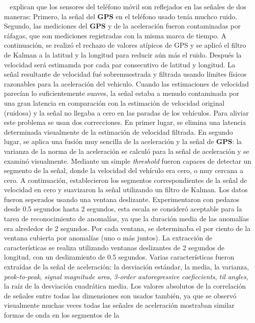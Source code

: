 ~\parencite{perttunen2011distributed} explican que los sensores del teléfono móvil son reflejados en las señales de dos maneras: Primero, la señal del \textbf{GPS}
en el teléfono usado tenía muchco ruido. Segundo, las mediciones del \textbf{GPS} y de la aceleración fueron contaminadas por ráfagas, que son mediciones registradas con la
misma marca de tiempo. A continuación, se realizó el rechazo de valores atípicos de GPS y se aplicó el filtro de Kalman a la latitud y la longitud para reducir
aún más el ruido. Después la velocidad será estimamda por cada par consecutivo de latitud y longitud. La señal resultante de velocidad fué sobremuestrada y filtrada
usando límites físicos razonables para la aceleración del vehiculo. Cuando las estimaciones de velocidad parecían lo suficientemente suaves, la señal estaba
a menudo contaminada por una gran latencia en comparación con la estimación de velocidad original (ruidosa) y la señal no llegaba a cero en las paradas de los vehículos.
Para aliviar este problema se usan dos correcciones. En primer lugar, se elimina una latencia determinada visualmente de la estimación de velocidad filtrada. En segundo
lugar, se aplica una fusión muy sencilla de la aceleración y la señal de \textbf{GPS}: la varianza de la norma de la aceleración se calculó para la señal de aceleración
y se examinó visualmente. Mediante un simple \emph{threshold} fueron capaces de detectar un segmento de la señal, donde la velocidad del vehículo era cero, o muy cercana
a cero. A continuación, establecieron los segmentos correspondientes de la señal de velocidad en cero y suavizaron la señal utilizando un filtro de Kalman. Los datos
fueron seperados usando una ventana deslizante. Experimentaron con pedazos desde 0.5 segundos hasta 2 segundos, esta escala se consideró aceptable para la tarea de
reconocimiento de anomalías, ya que la duración media de las anomalías era alrededor de 2 segundos. Por cada ventana, se determinaba el por ciento de la ventana cubierta
por anomalías (uno o más juntos). La extracción de características se realiza utilizando ventanas deslizantes de 2 segundos de longitud, con un deslizamiento de 0.5
segundos. Varias características fueron extraídas de la señal de aceleración: la desviación estándar, la media, la varianza, \emph{peok-to-peak}, \emph{signal magnitude area},
\emph{3-order autoregressive coeficcients}, \emph{til angles}, la raíz de la desviación cuadrática media. Los valores absolutos de la correlación de señales entre todas
las dimensiones son usados también, ya que se observó visualmente muchas veces todas las señales de aceleración mostraban similar formas de onda en los segmentos de la

